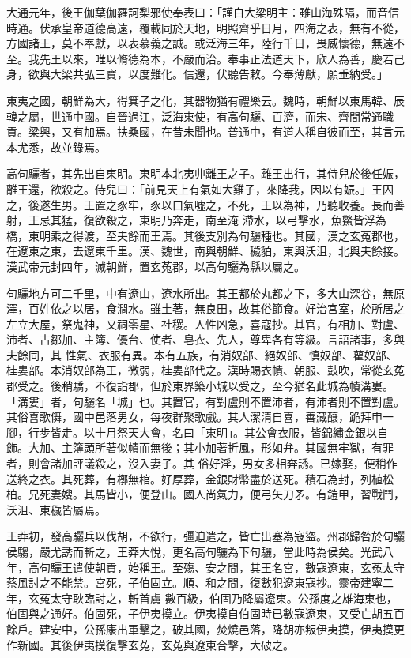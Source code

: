 \begin{pinyinscope}
 大通元年，後王伽葉伽羅訶梨邪使奉表曰：「謹白大梁明主：雖山海殊隔，而音信時通。伏承皇帝道德高遠，覆載同於天地，明照齊乎日月，四海之表，無有不從，方國諸王，莫不奉獻，以表慕義之誠。或泛海三年，陸行千日，畏威懷德，無遠不至。我先王以來，唯以脩德為本，不嚴而治。奉事正法道天下，欣人為善，慶若己身，欲與大梁共弘三寶，以度難化。信還，伏聽告敕。今奉薄獻，願垂納受。」



 東夷之國，朝鮮為大，得箕子之化，其器物猶有禮樂云。魏時，朝鮮以東馬韓、辰韓之屬，世通中國。自晉過江，泛海東使，有高句驪、百濟，而宋、齊間常通職貢。梁興，又有加焉。扶桑國，在昔未聞也。普通中，有道人稱自彼而至，其言元本尤悉，故並錄焉。



 高句驪者，其先出自東明。東明本北夷丱離王之子。離王出行，其侍兒於後任娠，離王還，欲殺之。侍兒曰：「前見天上有氣如大雞子，來降我，因以有娠。」王囚之，後遂生男。王置之豕牢，豕以口氣噓之，不死，王以為神，乃聽收養。長而善射，王忌其猛，復欲殺之，東明乃奔走，南至淹
 滯水，以弓擊水，魚鱉皆浮為橋，東明乘之得渡，至夫餘而王焉。其後支別為句驪種也。其國，漢之玄菟郡也，在遼東之東，去遼東千里。漢、魏世，南與朝鮮、穢貃，東與沃沮，北與夫餘接。漢武帝元封四年，滅朝鮮，置玄菟郡，以高句驪為縣以屬之。



 句驪地方可二千里，中有遼山，遼水所出。其王都於丸都之下，多大山深谷，無原澤，百姓依之以居，食澗水。雖土著，無良田，故其俗節食。好治宮室，於所居之左立大屋，祭鬼神，又祠零星、社稷。人性凶急，喜寇抄。其官，有相加、對盧、沛者、古鄒加、主簿、優台、使者、皂衣、先人，尊卑各有等級。言語諸事，多與夫餘同，其
 性氣、衣服有異。本有五族，有消奴部、絕奴部、慎奴部、雚奴部、桂婁部。本消奴部為王，微弱，桂婁部代之。漢時賜衣幘、朝服、鼓吹，常從玄菟郡受之。後稍驕，不復詣郡，但於東界築小城以受之，至今猶名此城為幘溝婁。「溝婁」者，句驪名「城」也。其置官，有對盧則不置沛者，有沛者則不置對盧。其俗喜歌儛，國中邑落男女，每夜群聚歌戲。其人潔清自喜，善藏釀，跪拜申一腳，行步皆走。以十月祭天大會，名曰「東明」。其公會衣服，皆錦繡金銀以自飾。大加、主簿頭所著似幘而無後；其小加著折風，形如弁。其國無牢獄，有罪者，則會諸加評議殺之，沒入妻子。其
 俗好淫，男女多相奔誘。已嫁娶，便稍作送終之衣。其死葬，有槨無棺。好厚葬，金銀財幣盡於送死。積石為封，列植松柏。兄死妻嫂。其馬皆小，便登山。國人尚氣力，便弓矢刀矛。有鎧甲，習戰鬥，沃沮、東穢皆屬焉。



 王莽初，發高驪兵以伐胡，不欲行，彊迫遣之，皆亡出塞為寇盜。州郡歸咎於句驪侯騶，嚴尤誘而斬之，王莽大悅，更名高句驪為下句驪，當此時為侯矣。光武八年，高句驪王遣使朝貢，始稱王。至殤、安之間，其王名宮，數寇遼東，玄菟太守蔡風討之不能禁。宮死，子伯固立。順、和之間，復數犯遼東寇抄。靈帝建寧二年，玄菟太守耿臨討之，斬首虜
 數百級，伯固乃降屬遼東。公孫度之雄海東也，伯固與之通好。伯固死，子伊夷摸立。伊夷摸自伯固時已數寇遼東，又受亡胡五百餘戶。建安中，公孫康出軍擊之，破其國，焚燒邑落，降胡亦叛伊夷摸，伊夷摸更作新國。其後伊夷摸復擊玄菟，玄菟與遼東合擊，大破之。




\end{pinyinscope}
